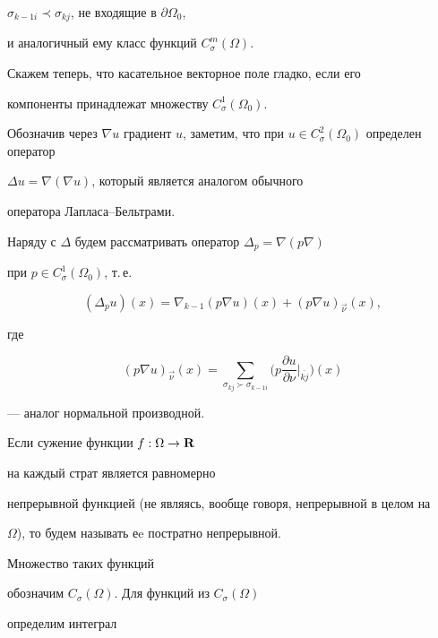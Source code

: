 $\sigma_{k-1i}\prec\sigma_{kj}$, не входящие в $\partial\Omega_0$, 


и аналогичный ему класс функций $C^m_\sigma(\Omega)$. 


Скажем теперь, что касательное векторное поле гладко, если его 


компоненты принадлежат множеству $C^1_\sigma (\Omega_0)$. 


 


Обозначив через $\nabla u$ градиент $u$, заметим, что при $u\in 


C^2_{\sigma}(\Omega_0)$ определен оператор 


$\Delta u=\nabla(\nabla u)$, который является аналогом обычного 


оператора Лапласа--Бельтрами. 


Наряду с $\Delta$ будем рассматривать оператор $\Delta_p=\nabla(p\nabla)$ 


при $p\in C^1_\sigma(\Omega_0)$, т.\,е. 


$$ 


(\Delta_p u)(x)=\nabla_{k-1}(p\nabla u)(x)+(p\nabla u)_{\Vec\nu}(x), 


$$ 


где 


\begin{equation} 


(p\nabla u)_{\Vec\nu}(x)= 


\sum_{\sigma_{kj}\succ\sigma_{k-1i}}\bigg(p 


\frac{\partial u}{\partial\nu}\Big|_{\overline{kj}}\bigg)(x) 


\end{equation} 


--- аналог нормальной производной. 


 


Если сужение функции $f:\Omega \to {\bold R}$  


на каждый страт является равномерно 


непрерывной функцией (не являясь, вообще говоря, непрерывной в целом на 


$\Omega$), то будем называть еe постратно непрерывной.  


Множество таких функций 


обозначим $C_\sigma(\Omega)$. Для функций из $C_\sigma(\Omega)$ 


определим интеграл 


$$


